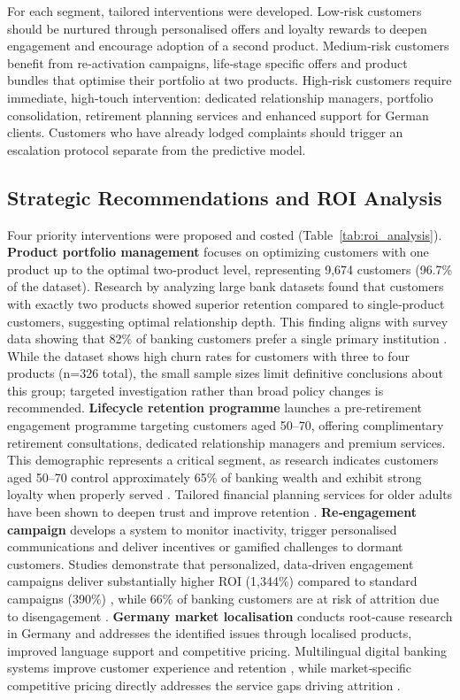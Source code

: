\documentclass[12pt]{article}
\begin{document}
For each segment, tailored interventions were developed.  Low‑risk customers should be nurtured through personalised offers and loyalty rewards to deepen engagement and encourage adoption of a second product.  Medium‑risk customers benefit from re‑activation campaigns, life‑stage specific offers and product bundles that optimise their portfolio at two products.  High‑risk customers require immediate, high‑touch intervention: dedicated relationship managers, portfolio consolidation, retirement planning services and enhanced support for German clients.  Customers who have already lodged complaints should trigger an escalation protocol separate from the predictive model.

\subsection{Strategic Recommendations and ROI Analysis}
Four priority interventions were proposed and costed (Table~\ref{tab:roi_analysis}).  \textbf{Product portfolio management} focuses on optimizing customers with one product up to the optimal two‑product level, representing 9,674 customers (96.7\% of the dataset).  Research by \citet{singh2024productchurn} analyzing large bank datasets found that customers with exactly two products showed superior retention compared to single‑product customers, suggesting optimal relationship depth.  This finding aligns with survey data showing that 82\% of banking customers prefer a single primary institution \citep{smith2025switching}.  While the dataset shows high churn rates for customers with three to four products (n=326 total), the small sample sizes limit definitive conclusions about this group; targeted investigation rather than broad policy changes is recommended.  \textbf{Lifecycle retention programme} launches a pre‑retirement engagement programme targeting customers aged 50–70, offering complimentary retirement consultations, dedicated relationship managers and premium services.  This demographic represents a critical segment, as research indicates customers aged 50–70 control approximately 65\% of banking wealth and exhibit strong loyalty when properly served \citep{marr2024aging}.  Tailored financial planning services for older adults have been shown to deepen trust and improve retention \citep{ncrc2021agefriendly}.  \textbf{Re‑engagement campaign} develops a system to monitor inactivity, trigger personalised communications and deliver incentives or gamified challenges to dormant customers.  Studies demonstrate that personalized, data‑driven engagement campaigns deliver substantially higher ROI (1,344\%) compared to standard campaigns (390\%) \citep{cline2024churn}, while 66\% of banking customers are at risk of attrition due to disengagement \citep{cornerstone2025dormant}.  \textbf{Germany market localisation} conducts root‑cause research in Germany and addresses the identified issues through localised products, improved language support and competitive pricing.  Multilingual digital banking systems improve customer experience and retention \citep{hunsicker2023multilingual}, while market‑specific competitive pricing directly addresses the service gaps driving attrition \citep{smith2025switching}.
\end{document}
